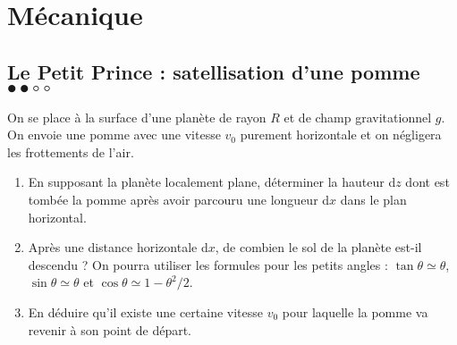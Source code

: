 \chapter{Mécanique}

\newpage

\section{Le Petit Prince : satellisation d'une pomme $\bullet\bullet\circ\circ$}

On se place à la surface d'une planète de rayon $R$ et de champ gravitationnel $g$. On envoie une pomme avec une vitesse $v_0$ purement horizontale et on négligera les frottements de l'air.

\begin{enumerate}
\item En supposant la planète localement plane, déterminer la hauteur d$z$ dont est tombée la pomme après avoir parcouru une longueur d$x$ dans le plan horizontal. %
\item Après une distance horizontale d$x$, de combien le sol de la planète est-il descendu ? On pourra utiliser les formules pour les petits angles : $\tan\theta\simeq \theta$, $\sin\theta\simeq \theta$ et $\cos\theta\simeq 1-\theta^2/2$. %
\item En déduire qu'il existe une certaine vitesse $v_0$ pour laquelle la pomme va revenir à son point de départ. %
\end{enumerate}

\newpage

